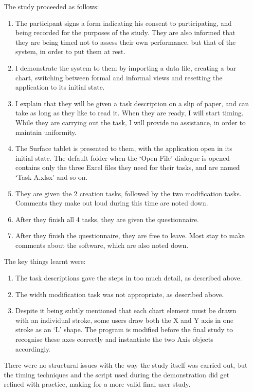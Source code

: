The study proceeded as follows:
\begin{enumerate}
\item The participant signs a form indicating his consent to participating, and being recorded for the purposes of the study. They are also informed that they are being timed not to assess their own performance, but that of the system, in order to put them at rest.
\item I demonstrate the system to them by importing a data file, creating a bar chart, switching between formal and informal views and resetting the application to its initial state.
\item I explain that they will be given a task description on a slip of paper, and can take as long as they like to read it. When they are ready, I will start timing. While they are carrying out the task, I will provide no assistance, in order to maintain uniformity.
\item The Surface tablet is presented to them, with the application open in its initial state. The default folder when the `Open File' dialogue is opened contains only the three Excel files they need for their tasks, and are named `Task A.xlsx' and so on.
\item They are given the 2 creation tasks, followed by the two modification tasks. Comments they make out loud during this time are noted down. 
\item After they finish all 4 tasks, they are given the questionnaire.
\item After they finish the questionnaire, they are free to leave. Most stay to make comments about the software, which are also noted down.
\end{enumerate}

The key things learnt were:
\begin{enumerate}
\item The task descriptions gave the steps in too much detail, as described above.
\item The width modification task was not appropriate, as described above.
\item Despite it being subtly mentioned that each chart element must be drawn with an individual stroke, some users draw both the X and Y axis in one stroke as an `L' shape. The program is modified before the final study to recognise these axes correctly and instantiate the two Axis objects accordingly. 
\end{enumerate}

There were no structural issues with the way the study itself was carried out, but the timing techniques and the script used during the demonstration did get refined with practice, making for a more valid final user study.

